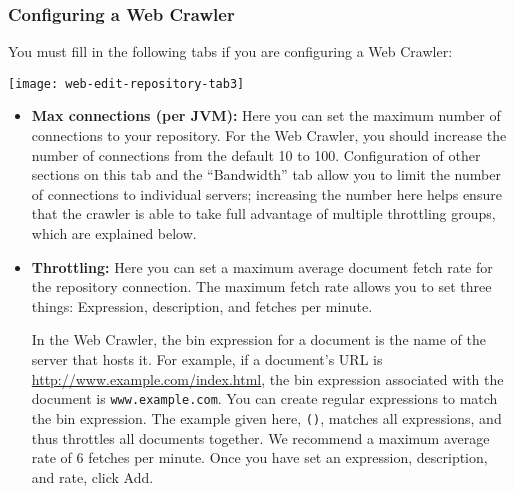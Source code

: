 %
%

\subsubsection{Configuring a Web Crawler}

You must fill in the following tabs if you are configuring a Web Crawler:

\texttt{[image: web-edit-repository-tab3]}

\begin{itemize}

\item \textbf{Max connections (per JVM):} Here you can set the
maximum number of connections to your repository. For the Web Crawler,
you should increase the number of connections from the default 10 to
100. Configuration of other sections on this tab and the ``Bandwidth''
tab allow you to limit the number of connections to individual servers;
increasing the number here helps ensure that the crawler is able to take
full advantage of multiple throttling groups, which are explained below.


\item \textbf{Throttling:} Here you can set a maximum average document fetch
rate for the repository connection. The maximum fetch rate allows you
to set three things: Expression, description, and fetches per minute.

In the Web Crawler, the bin expression for a document is the name of
the server that hosts it. For example, if a document's URL is
\url{http://www.example.com/index.html}, the bin expression
associated with the document is \texttt{www.example.com}.  You can
create regular expressions to match the bin expression. The example
given here, \texttt{()}, matches all expressions, and thus throttles
all documents together. We recommend a maximum average rate of 6
fetches per minute.  Once you have set an expression, description, and
rate, click Add.


\end{itemize}

